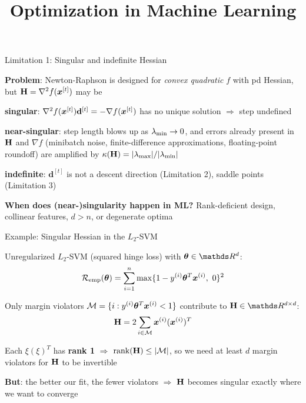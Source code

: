 \documentclass[11pt,compress,t,notes=noshow, xcolor=table]{beamer}
\title{Optimization in Machine Learning}
\begin{document}

\begin{framei}[sep=L]{Limitation 1: Singular and indefinite Hessian}
\item \textbf{Problem}: Newton-Raphson is designed for \textit{convex quadratic} $f$ with pd Hessian, but
$\mathbf{H} = \nabla^2 f(\bm{x}^{[t]})$ may be
\begin{itemizeM}
\item \textbf{singular}: $\nabla^2 f(\bm{x}^{[t]}) \mathbf{d}^{[t]} = - \nabla f(\bm{x}^{[t]})$ has no unique solution
$\Rightarrow$ step undefined
\item \textbf{near-singular}: step length blows up as $\lambda_\text{min} \to 0$, and errors already present in
$\mathbf{H}$ and $\nabla f$ (minibatch noise, finite-difference approximations, floating-point roundoff)
are amplified by $\kappa(\mathbf{H}) = |\lambda_\text{max}| / |\lambda_\text{min}|$
\item \textbf{indefinite}: $\mathbf{d}^{[t]}$ is not a descent direction (Limitation 2), saddle points (Limitation 3)
\end{itemizeM}
\item \textbf{When does (near-)singularity happen in ML?} Rank-deficient design, collinear features, $d > n$,
or degenerate optima
\end{framei}


\begin{framei}[sep=L]{Example: Singular Hessian in the $L_2$-SVM}
\item Unregularized $L_2$-SVM (squared hinge loss) with $\thetav \in \R^d$:
$$
\mathcal{R}_{\text{emp}}(\bm{\theta}) = \sum\limits_{i=1}^n \max\{1 - y^{(i)} \bm{\theta}^T \bm{x}^{(i)}, ~0\}^2
$$
\item Only margin violators $\mathcal{M} = \{i: y^{(i)} \bm{\theta}^T \bm{x}^{(i)} < 1\}$ contribute to $\H \in \R^{d \times d}$:
$$
\mathbf{H} = 2 \sum_{i \in \mathcal{M}} \bm{x}^{(i)} (\bm{x}^{(i)})^T
$$
\item Each $\xi (\xi)^T$ has \textbf{rank 1} $\Rightarrow$ $\operatorname{rank}(\mathbf{H}) \leq |\mathcal{M}|$,
so we need at least $d$ margin violators for $\mathbf{H}$ to be invertible
\item \textbf{But}: the better our fit, the fewer violators
$\Rightarrow$ $\mathbf{H}$ becomes singular exactly where we want to converge
\end{framei}
\end{document}
